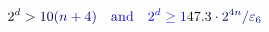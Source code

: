 \documentclass[12pt]{article}
\begin{document}
\makeatletter
\renewcommand*{\@textcolor}[3]{%
  \protect\leavevmode
  \begingroup
    \color#1{#2}#3%
  \endgroup
}
\makeatother
\begin{displaymath}
\mathcolor[RGB]{0,0,15}{2} ^ { \mathcolor[RGB]{0,0,30}{d} } \mathcolor[RGB]{0,0,45}{>} \mathcolor[RGB]{0,0,60}{1} \mathcolor[RGB]{0,0,75}{0} \mathcolor[RGB]{0,0,90}{(} \mathcolor[RGB]{0,0,105}{n} \mathcolor[RGB]{0,0,120}{+} \mathcolor[RGB]{0,0,135}{4} \mathcolor[RGB]{0,0,150}{)} \quad \mathrm { \mathcolor[RGB]{0,0,165}{a} \mathcolor[RGB]{0,0,180}{n} \mathcolor[RGB]{0,0,195}{d} } \quad \mathcolor[RGB]{0,0,210}{2} ^ { \mathcolor[RGB]{0,0,225}{d} } \mathcolor[RGB]{0,0,240}{\ge} \mathcolor[RGB]{0,0,255}{1} \mathcolor[RGB]{0,15,0}{4} \mathcolor[RGB]{0,15,15}{7} \mathcolor[RGB]{0,15,30}{.} \mathcolor[RGB]{0,15,45}{3} \mathcolor[RGB]{0,15,60}{\cdot} \mathcolor[RGB]{0,15,75}{2} ^ { \mathcolor[RGB]{0,15,90}{4} \mathcolor[RGB]{0,15,105}{n} } \mathcolor[RGB]{0,15,120}{/} \mathcolor[RGB]{0,15,135}{\varepsilon} _ { \mathcolor[RGB]{0,15,150}{6} }
\end{displaymath}
\end{document}
